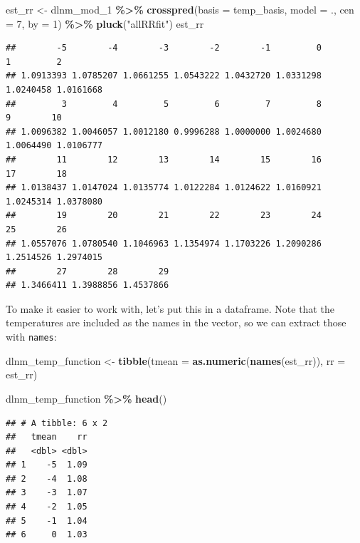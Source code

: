 \documentclass[
]{book}
\newenvironment{Shaded}{\begin{snugshade}}{\end{snugshade}}
\newcommand{\AttributeTok}[1]{\textcolor[rgb]{0.13,0.29,0.53}{#1}}
\newcommand{\DecValTok}[1]{\textcolor[rgb]{0.00,0.00,0.81}{#1}}
\newcommand{\FunctionTok}[1]{\textcolor[rgb]{0.13,0.29,0.53}{\textbf{#1}}}
\newcommand{\NormalTok}[1]{#1}
\newcommand{\OtherTok}[1]{\textcolor[rgb]{0.56,0.35,0.01}{#1}}
\newcommand{\SpecialCharTok}[1]{\textcolor[rgb]{0.81,0.36,0.00}{\textbf{#1}}}
\newcommand{\StringTok}[1]{\textcolor[rgb]{0.31,0.60,0.02}{#1}}
\begin{document}
\begin{Shaded}
\begin{Highlighting}[]
\NormalTok{est\_rr }\OtherTok{\textless{}{-}}\NormalTok{ dlnm\_mod\_1 }\SpecialCharTok{\%\textgreater{}\%} 
  \FunctionTok{crosspred}\NormalTok{(}\AttributeTok{basis =}\NormalTok{ temp\_basis, }\AttributeTok{model =}\NormalTok{ ., }\AttributeTok{cen =} \DecValTok{7}\NormalTok{, }\AttributeTok{by =} \DecValTok{1}\NormalTok{) }\SpecialCharTok{\%\textgreater{}\%} 
  \FunctionTok{pluck}\NormalTok{(}\StringTok{"allRRfit"}\NormalTok{)}
\NormalTok{est\_rr}
\end{Highlighting}
\end{Shaded}

\begin{verbatim}
##        -5        -4        -3        -2        -1         0         1         2 
## 1.0913393 1.0785207 1.0661255 1.0543222 1.0432720 1.0331298 1.0240458 1.0161668 
##         3         4         5         6         7         8         9        10 
## 1.0096382 1.0046057 1.0012180 0.9996288 1.0000000 1.0024680 1.0064490 1.0106777 
##        11        12        13        14        15        16        17        18 
## 1.0138437 1.0147024 1.0135774 1.0122284 1.0124622 1.0160921 1.0245314 1.0378080 
##        19        20        21        22        23        24        25        26 
## 1.0557076 1.0780540 1.1046963 1.1354974 1.1703226 1.2090286 1.2514526 1.2974015 
##        27        28        29 
## 1.3466411 1.3988856 1.4537866
\end{verbatim}

To make it easier to work with, let's put this in a dataframe. Note that the temperatures
are included as the names in the vector, so we can extract those with \texttt{names}:

\begin{Shaded}
\begin{Highlighting}[]
\NormalTok{dlnm\_temp\_function }\OtherTok{\textless{}{-}} \FunctionTok{tibble}\NormalTok{(}\AttributeTok{tmean =} \FunctionTok{as.numeric}\NormalTok{(}\FunctionTok{names}\NormalTok{(est\_rr)), }
                             \AttributeTok{rr =}\NormalTok{ est\_rr)}

\NormalTok{dlnm\_temp\_function }\SpecialCharTok{\%\textgreater{}\%} 
  \FunctionTok{head}\NormalTok{()}
\end{Highlighting}
\end{Shaded}

\begin{verbatim}
## # A tibble: 6 x 2
##   tmean    rr
##   <dbl> <dbl>
## 1    -5  1.09
## 2    -4  1.08
## 3    -3  1.07
## 4    -2  1.05
## 5    -1  1.04
## 6     0  1.03
\end{verbatim}
\end{document}
